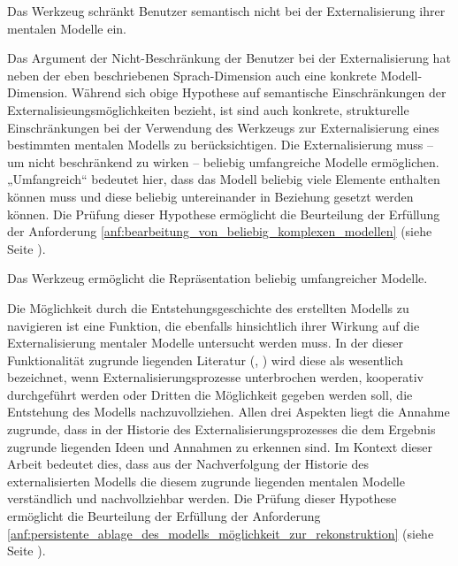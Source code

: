 \begin{hyp}
	\label{hyp:keine_einschränkung}
	Das Werkzeug schränkt Benutzer semantisch nicht bei der Externalisierung ihrer mentalen Modelle ein.
\end{hyp}

Das Argument der Nicht-Beschränkung der Benutzer bei der Externalisierung hat neben der eben beschriebenen Sprach-Dimension auch eine konkrete Modell-Dimension. Während sich obige Hypothese auf semantische Einschränkungen der Externalisieungsmöglichkeiten bezieht, ist sind auch konkrete, strukturelle Einschränkungen bei der Verwendung des Werkzeugs zur Externalisierung eines bestimmten mentalen Modells zu berücksichtigen. Die Externalisierung muss -- um nicht beschränkend zu wirken -- beliebig umfangreiche Modelle ermöglichen. „Umfangreich“ bedeutet hier, dass das Modell beliebig viele Elemente enthalten können muss und diese beliebig untereinander in Beziehung gesetzt werden können. Die Prüfung dieser Hypothese ermöglicht die Beurteilung der Erfüllung der Anforderung \ref{anf:bearbeitung_von_beliebig_komplexen_modellen} (siehe Seite \pageref{anf:bearbeitung_von_beliebig_komplexen_modellen}).
	
\begin{hyp}
	\label{hyp:beliebige_komplexität}
	Das Werkzeug ermöglicht die Repräsentation beliebig umfangreicher Modelle.
\end{hyp}

Die Möglichkeit durch die Entstehungsgeschichte des erstellten Modells zu navigieren ist eine Funktion, die ebenfalls hinsichtlich ihrer Wirkung auf die Externalisierung mentaler Modelle untersucht werden muss. In der dieser Funktionalität zugrunde liegenden Literatur (\citep{Shipman00}, \citep{Klemmer02}) wird diese als wesentlich bezeichnet, wenn Externalisierungsprozesse unterbrochen werden, kooperativ durchgeführt werden oder Dritten die Möglichkeit gegeben werden soll, die Entstehung des Modells nachzuvollziehen. Allen drei Aspekten liegt die Annahme zugrunde, dass in der Historie des Externalisierungsprozesses die dem Ergebnis zugrunde liegenden Ideen und Annahmen zu erkennen sind. Im Kontext dieser Arbeit bedeutet dies, dass aus der Nachverfolgung der Historie des externalisierten Modells die diesem zugrunde liegenden mentalen Modelle verständlich und nachvollziehbar werden. Die Prüfung dieser Hypothese ermöglicht die Beurteilung der Erfüllung der Anforderung \ref{anf:persistente_ablage_des_modells_möglichkeit_zur_rekonstruktion} (siehe Seite \pageref{anf:persistente_ablage_des_modells_möglichkeit_zur_rekonstruktion}).

